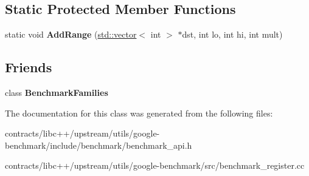 \subsection*{Static Protected Member Functions}
\begin{DoxyCompactItemize}
\item 
\mbox{\label{classbenchmark_1_1internal_1_1_benchmark_a14b85278922ff3cc70072ea383e64b6b}} 
static void {\bfseries Add\+Range} (\mbox{\hyperlink{classstd_1_1vector}{std\+::vector}}$<$ int $>$ $\ast$dst, int lo, int hi, int mult)
\end{DoxyCompactItemize}
\subsection*{Friends}
\begin{DoxyCompactItemize}
\item 
\mbox{\label{classbenchmark_1_1internal_1_1_benchmark_aec4a1eb2b1fe7d35acebfdc65d6746c8}} 
class {\bfseries Benchmark\+Families}
\end{DoxyCompactItemize}


The documentation for this class was generated from the following files\+:\begin{DoxyCompactItemize}
\item 
contracts/libc++/upstream/utils/google-\/benchmark/include/benchmark/benchmark\+\_\+api.\+h\item 
contracts/libc++/upstream/utils/google-\/benchmark/src/benchmark\+\_\+register.\+cc\end{DoxyCompactItemize}
